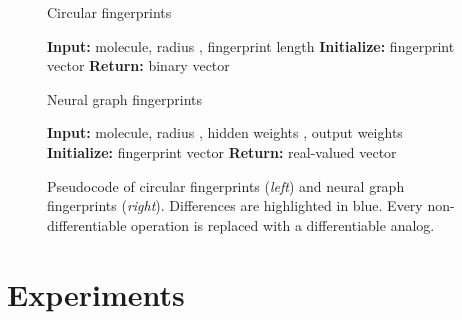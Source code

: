 \documentclass{article}
\begin{document}
\algrenewcommand\algorithmicindent{1.3em}\begin{figure*}[t]
 \begin{minipage}[t]{0.49\columnwidth}
 \begin{algorithm}[H]
\caption{Circular fingerprints} 
\label{alg:ecfp} 
\begin{algorithmic}[1]
\State \textbf{Input:} {molecule, radius , fingerprint length }
\State \textbf{Initialize:} {fingerprint vector }
    \State  {}
\EndFor
{} 
		\State 
		\State  {}
		\State  {}
		\State  {}		
		\State  {}
	\EndFor
\EndFor
\State \textbf{Return:} {binary vector }
\end{algorithmic}
\end{algorithm}
\end{minipage}
\hfill
\begin{minipage}[t]{0.49\columnwidth}
\begin{algorithm}[H]
\caption{Neural graph fingerprints} 
\label{alg:neural} 
\begin{algorithmic}[1]
\State \textbf{Input:} {molecule, radius , {\color{myfavblue} hidden weights , output weights }}
\State \textbf{Initialize:} {fingerprint vector }
	\State  {}
\EndFor
{} 
		\State 
		\State  {}
\State  {}
		\State  {}
		\State  {}
    \EndFor
\EndFor
\State \textbf{Return:} { {\color{myfavblue} real-valued} vector }
\end{algorithmic}
\end{algorithm}
\end{minipage}
\hfill
\caption{Pseudocode of circular fingerprints (\emph{left}) and neural graph fingerprints (\emph{right}).
Differences are highlighted in blue.
Every non-differentiable operation is replaced with a differentiable analog.}
\end{figure*}


\section{Experiments}
\label{sec:experiments}
\end{document}
